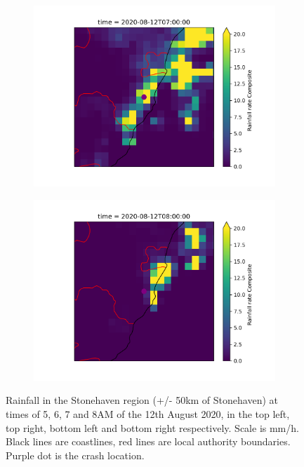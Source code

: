 \documentclass[12pt,a4paper]{report}
\begin{document}
\begin{figure}[H]
    \begin{subfigure}{0.48\textwidth}
        \centering
        \includegraphics[width=\linewidth]{stonerain7}
    \end{subfigure}
    \hfill
    \begin{subfigure}{0.48\textwidth}
        \centering
        \includegraphics[width=\linewidth]{stonerain8}
    \end{subfigure}
    \caption{Rainfall in the Stonehaven region (+/- 50km of Stonehaven)
        at times of 5, 6, 7 and 8AM of the 12th August 2020,
        in the top left, top right, bottom left and bottom right respectively.
    Scale is mm/h.
    Black lines are coastlines, red lines are local authority boundaries.
    Purple dot is the crash location.}
    \label{fig:stoneregionrain}
\end{figure}
\end{document}
